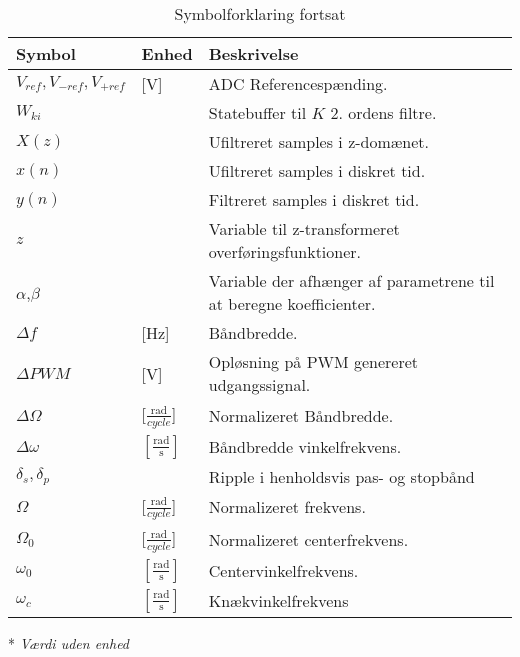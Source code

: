 \begin{table}[ht]
\centering
\caption{Symbolforklaring fortsat}
\label{tab:symboler2}
\begin{threeparttable}
\begin{tabular}{l l l}
\toprule
\multicolumn{1}{l}{Symbol}       &
\multicolumn{1}{l}{Enhed}        &
\multicolumn{1}{l}{Beskrivelse}  \\ 
\midrule
$V_{ref},V_{-ref},V_{+ref}$ & [\si{\volt}] & ADC Referencespænding. \\
$W_{ki}$\tnote{*}	    &   			& Statebuffer til $K$ 2. ordens filtre.\\
$X(z)$\tnote{*}	    &		            & Ufiltreret samples i  z-domænet.	\\
$x(n)$\tnote{*}	    &		            & Ufiltreret samples i diskret tid.	\\
$y(n)$\tnote{*}	    &		            & Filtreret samples i diskret tid.	\\
$z$\tnote{*}		&					& Variable til z-transformeret overføringsfunktioner.\\
$\alpha$\tnote{*},$\beta$\tnote{*}	    &   			& Variable der afhænger af parametrene til at beregne koefficienter.\\
$\Delta f$			&	[\si{\hertz}]	& Båndbredde.	\\
$\Delta PWM$ & [\si{\volt}] & Opløsning på PWM genereret udgangssignal. \\
$\Delta \Omega$	&	[$\frac{\si{\radian}}{cycle}$]				& Normalizeret Båndbredde.	\\
$\Delta \omega$		&	$[\frac{\si{\radian}}{\si{\second}}]$	& Båndbredde vinkelfrekvens.	\\
$\delta_s, \delta_p$\tnote{*}	&   				& Ripple i henholdsvis pas- og stopbånd\\
$\Omega$	&	[$\frac{\si{\radian}}{cycle}$]				& Normalizeret frekvens.	\\
$\Omega_0$	&	[$\frac{\si{\radian}}{cycle}$]				& Normalizeret centerfrekvens.	\\
$\omega_0$			&	$[\frac{\si{\radian}}{\si{\second}}]$	& Centervinkelfrekvens.	\\
$\omega _c$ & $[\frac{\si{\radian}}{\si{\second}}]$ & Knækvinkelfrekvens \\
\bottomrule
\end{tabular}
\begin{tablenotes}
\item[*] \textit{Værdi uden enhed}
\end{tablenotes}
\end{threeparttable}
\end{table}


